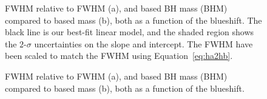 \begin{figure}
    \caption[{ FWHM relative to \ha FWHM (a), and  based BH mass (BHM) compared to \ha based mass (b), both as a function of the  blueshift.}]{ FWHM relative to \ha FWHM (a), and  based BH mass (BHM) compared to \ha based mass (b), both as a function of the  blueshift. The black line is our best-fit linear model, and the shaded region shows the $2$-$\sigma$ uncertainties on the slope and intercept. The \ha FWHM have been scaled to match the \hb FWHM using Equation~\ref{eq:ha2hb}.}  
    \label{fig:correction_ha}
\end{figure}

\begin{figure}
    \captionsetup[subfigure]{labelformat=empty} 
    \centering
    \subfloat[\label{fig:correction_hb_a}]{}
    \subfloat[\label{fig:correction_hb_b}]{}
    \caption{ FWHM relative to \hb FWHM (a), and  based BH mass (BHM) compared to \hb based mass (b), both as a function of the  blueshift.}  
    \label{fig:correction_hb}
\end{figure}

